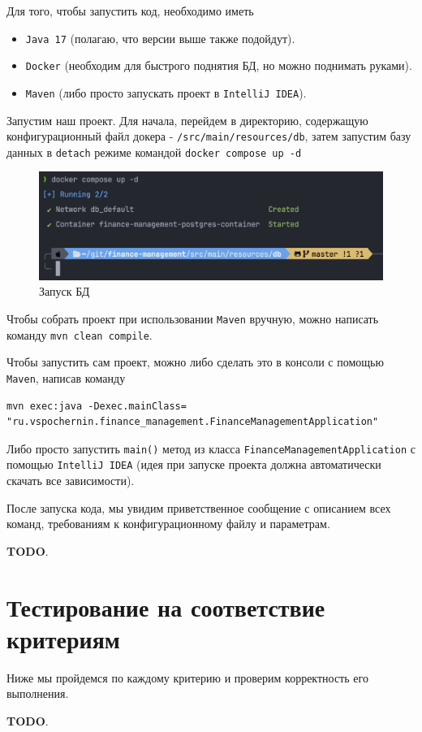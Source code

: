\documentclass[a4paper, 14pt]{article}
\begin{document}
Для того, чтобы запустить код, необходимо иметь

\begin{itemize}
	\item \texttt{Java 17} (полагаю, что версии выше также подойдут).
	\item \texttt{Docker} (необходим для быстрого поднятия БД, но можно поднимать руками).
	\item \texttt{Maven} (либо просто запускать проект в \texttt{IntelliJ IDEA}).
\end{itemize}

Запустим наш проект. Для начала, перейдем в директорию, содержащую конфигурационный файл докера - \texttt{/src/main/resources/db}, затем запустим базу данных в \texttt{detach} режиме командой \texttt{docker compose up -d}

\begin{figure}[H]
	\centering
	\includegraphics[width=17cm]{resources/2.png}
	\caption{Запуск БД}
\end{figure}

Чтобы собрать проект при использовании \texttt{Maven} вручную, можно написать команду \texttt{mvn clean compile}.

Чтобы запустить сам проект, можно либо сделать это в консоли с помощью \texttt{Maven}, написав команду
\begin{verbatim}
mvn exec:java -Dexec.mainClass=
"ru.vspochernin.finance_management.FinanceManagementApplication"
\end{verbatim}
Либо просто запустить \texttt{main()} метод из класса \texttt{FinanceManagementApplication} с помощью \texttt{IntelliJ IDEA} (идея при запуске проекта должна автоматически скачать все зависимости).


После запуска кода, мы увидим приветственное сообщение с описанием всех команд, требованиям к конфигурационному файлу и параметрам.

\textbf{TODO}.

\newpage
\section{Тестирование на соответствие критериям}

Ниже мы пройдемся по каждому критерию и проверим корректность его выполнения.

\textbf{TODO}.
\end{document}
